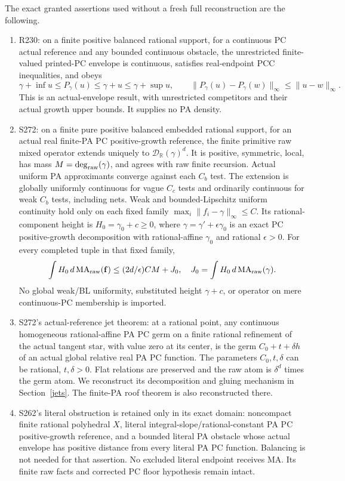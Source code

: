 \documentclass[11pt]{article}
\newcommand{\R}{\mathbb R}
\newcommand{\MA}{\operatorname{MA}_{\rm raw}}
\begin{document}
The exact granted assertions used without a fresh full reconstruction are the following.
\begin{enumerate}
\item R230: on a finite positive balanced rational support, for a continuous PC actual reference and any bounded continuous obstacle, the unrestricted finite-valued printed-PC envelope is continuous, satisfies real-endpoint PCC inequalities, and obeys
\[
 \gamma+\inf u\leq P_\gamma(u)\leq\gamma+u\leq\gamma+\sup u,
 \qquad \|P_\gamma(u)-P_\gamma(w)\|_\infty\leq\|u-w\|_\infty.
\]
This is an actual-envelope result, with unrestricted competitors and their actual growth upper bounds. It supplies no PA density.
\item S272: on a finite pure positive balanced embedded rational support, for an actual real finite-PA PC positive-growth reference, the finite primitive raw mixed operator extends uniquely to $\mathcal D_\R(\gamma)^d$. It is positive, symmetric, local, has mass $M=\deg_{\rm raw}(\gamma)$, and agrees with raw finite recursion. Actual uniform PA approximants converge against each $C_b$ test. The extension is globally uniformly continuous for vague $C_c$ tests and ordinarily continuous for weak $C_b$ tests, including nets. Weak and bounded-Lipschitz uniform continuity hold only on each fixed family $\max_i\|f_i-\gamma\|_\infty\leq C$. Its rational-component height is $H_0=\gamma_0+c\geq0$, where $\gamma=\gamma'+\epsilon\gamma_0$ is an exact PC positive-growth decomposition with rational-affine $\gamma_0$ and rational $\epsilon>0$. For every completed tuple in that fixed family,
\[
 \int H_0\,d\MA(\mathbf f)\leq(2d/\epsilon)CM+J_0,
 \quad J_0=\int H_0\,d\MA(\gamma).
\]
No global weak/BL uniformity, substituted height $\gamma+c$, or operator on mere continuous-PC membership is imported.
\item S272's actual-reference jet theorem: at a rational point, any continuous homogeneous rational-affine PA PC germ on a finite rational refinement of the actual tangent star, with value zero at its center, is the germ $C_0+t+\delta h$ of an actual global relative real PA PC function. The parameters $C_0,t,\delta$ can be rational, $t,\delta>0$. Flat relations are preserved and the raw atom is $\delta^d$ times the germ atom. We reconstruct its decomposition and gluing mechanism in Section~\ref{jets}. The finite-PA roof theorem is also reconstructed there.
\item S262's literal obstruction is retained only in its exact domain: noncompact finite rational polyhedral $X$, literal integral-slope/rational-constant PA PC positive-growth reference, and a bounded literal PA obstacle whose actual envelope has positive distance from every literal PA PC function. Balancing is not needed for that assertion. No excluded literal endpoint receives MA. Its finite raw facts and corrected PC floor hypothesis remain intact.
\end{enumerate}
\end{document}
